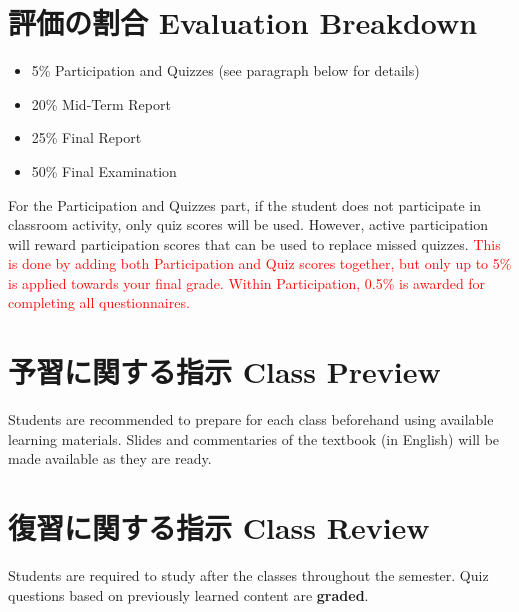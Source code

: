 \documentclass{article}
\begin{document}
\section{評価の割合 Evaluation Breakdown}
\begin{itemize}
    \item 5\% Participation and Quizzes (see paragraph below for details)
   	\item 20\% Mid-Term Report
   	\item 25\% Final Report
   	\item 50\% Final Examination
\end{itemize}

For the Participation and Quizzes part, if the student does not participate in classroom activity, only quiz scores will be used. However, active participation will reward participation scores that can be used to replace missed quizzes. \textcolor{red}{This is done by adding both Participation and Quiz scores together, but only up to 5\% is applied towards your final grade. Within Participation, 0.5\% is awarded for completing all questionnaires.}

\section{予習に関する指示 Class Preview}
Students are recommended to prepare for each class beforehand using available learning materials. Slides and commentaries of the textbook (in English) will be made available as they are ready.

\section{復習に関する指示 Class Review}
Students are required to study after the classes throughout the semester. Quiz questions based on previously learned content are \textbf{graded}.
\end{document}

